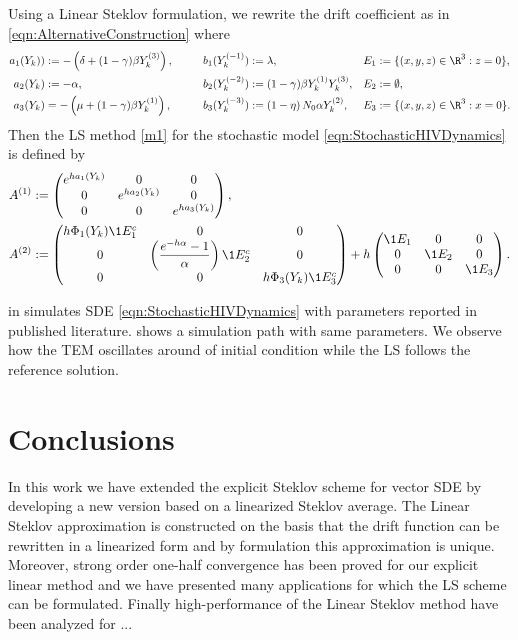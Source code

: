 \documentclass[sort&compress, preprint]{elsarticle}
\theoremstyle{definition}
\theoremstyle{plain}%
\theoremstyle{remark}
\newcommand{\SM}{LS\xspace}
\begin{document}
	Using a Linear Steklov formulation, we rewrite the drift coefficient as in
	\eqref{eqn:AlternativeConstruction} where 
	\begin{align}
		a_{1}(Y_k)) &:= 
			-\left(
				\delta + (1 - \gamma) \beta Y_k^{(3)}
			\right),		
			& b_1(Y_k^{(-1)}) &:= \lambda, 
			& E_1&:= \{ (x,y,z)\in \R^3: z=0\},
		\notag
		\\
		a_{2}(Y_k) &:= -\alpha,
			&b_2(Y_k^{(-2)}) & :=
			(1-\gamma) \beta Y_{k}^{(1)} Y_{k}^{(3)}, 
			&E_2&:=\emptyset,
		\notag
		\\
		a_{3}(Y_k) &= 
		-
		\left(
			\mu + (1- \gamma) \beta Y_{k}^{(1)}
		\right),
		\qquad
		&b_{3}(Y_k^{(-3)}) &:= 
		\left(
			1 - \eta 
		\right)
		N_0 \alpha Y_{k}^{(2)}, 
		& E_3&:= \{ (x,y,z)\in \R^3: x=0\}.
		\notag			
	\end{align}
	 Then  the LS method \eqref{m1} for the stochastic model \eqref{eqn:StochasticHIVDynamics} is defined by
		\begin{align}
		A^{(1)}&:=
		\begin{pmatrix}
		e^{ha_1(Y_k)}	&	0	&0 \\
		0	&e^{ha_2(Y_k)}	&0\\
		0	&0				&e^{ha_3(Y_k)}
	\end{pmatrix},
%	
	\notag
	\\
	A^{(2)}&:=
	\begin{pmatrix}
			h\Phi_1(Y_k)\1{E_1^c}	&0	&0\\
			0 & 
			\left(\displaystyle
					\frac{e^{-h\alpha} - 1}{\alpha}
			\right)\1{E_2^c} & 0\\
			0	&0
			& h\Phi_3(Y_k)\1{E_3^c}%
	\end{pmatrix}
	+h
	\begin{pmatrix}
		\1{E_1} & 0& 0\\
		 0 &\1{E_2}& 0\\
		0 & 0&	\1{E_3}
		\end{pmatrix}.
		\notag
\end{align}
	
\citeauthor{Dalal2008} in \cite{Dalal2008} simulates SDE \eqref{eqn:StochasticHIVDynamics} with parameters reported 
	in published literature.
	 shows a simulation path with same parameters. We observe how the TEM  
	oscillates around of initial condition while the \SM follows the reference solution.  


\section{Conclusions}
In this work we have extended the explicit Steklov scheme for  vector SDE by 
developing a new version  based on a 
linearized Steklov average. 
The Linear Steklov approximation is constructed on the basis that the drift function 
can be rewritten  in a linearized form and by formulation this approximation is unique. 
Moreover, strong order one-half convergence has been proved for our explicit 
linear method and we have presented  many applications for which the LS scheme can be formulated. 
Finally high-performance of the Linear Steklov method  have been analyzed for ...
\end{document}
